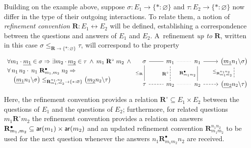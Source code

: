 Building on the example above, suppose
$\sigma : E_1 \rightarrow \{* : \varnothing\}$ and
$\tau : E_2 \rightarrow \{* : \varnothing\}$
now differ in the type of their outgoing interactions.
To relate them,
a notion of \emph{refinement convention}
$\mathbf{R} : E_1 \leftrightarrow E_2$
will be defined, establishing a correspondence between
the questions and answers of $E_1$ and $E_2$.
A~refinement \emph{up to} $\mathbf{R}$,
written in this case
$\sigma \le_{\mathbf{R} \rightarrow \{*:\varnothing\}} \tau$,
will correspond to the property
\begin{equation} \label{eqn:simupto}
  \begin{array}{l}
    \forall m_1 \cdot \underline{m_1} \in \sigma \Rightarrow {}
    \exists m_2 \cdot \underline{m_2} \in \tau \:\wedge\:
    m_1 \mathrel{\mathbf{R}^\circ} m_2 \:\wedge\: {}
    \\[0.66ex]
    \forall \, n_1 \, n_2 \cdot \:
    n_1 \mathrel{\mathbf{R}^\bullet_{m_1,m_2}} n_2 \Rightarrow
    \\[0.66ex] \quad
    \bigl(\underline{m_1} n_1 \backslash \sigma \bigr)
    \le_{\mathbf{R}_{m_1,m_2}^{n_1,n_2} \rightarrow \{*:\varnothing\}}
    \bigl(\underline{m_2} n_2 \backslash \tau \bigr)
  \end{array}
  \hspace{-1ex} %
  \begin{tikzcd}
    \sigma \ar[r,dash] \ar[d, dash, "\le_\mathbf{R}"'] &
    m_1 \ar[r,dotted,dash] \ar[d,dash,dashed,"\mathbf{R}^\circ"'] &
    n_1 \ar[r] \ar[d,dash, "\mathbf{R}^\bullet_{m_1m_2}"'] &
    \bigl(\underline{m_1} n_1 \backslash \sigma \bigr)
    \ar[d, dash, dashed, "\le_{\mathbf{R}_{m_1m_2}^{n_1n_2}}"']
    \\
    \tau \ar[r,dashed,dash] &
    m_2 \ar[r,dotted,dash] &
    n_2 \ar[r,dashed] &
    \bigl(\underline{m_2} n_2 \backslash \tau \bigr)
  \end{tikzcd}
\end{equation}
Here,
the refinement convention provides a relation
$\mathbf{R}^\circ \subseteq E_1 \times E_2$
between the questions of $E_1$ and the questions of $E_2$;
furthermore, for related questions $m_1 \mathrel{\mathbf{R}^\circ} m_2$
the refinement convention provides a relation on answers
$\mathbf{R}^\bullet_{m_1,m_2} \subseteq  \mathsf{ar} (m_1) \times  \mathsf{ar} (m_2)$
and an updated refinement convention
$\mathbf{R}_{m_1m_2}^{n_1n_2}$ to be used for the next question
whenever the answers $n_1 \mathrel{\mathbf{R}^\bullet_{m_1m_2}} n_2$
are received.

